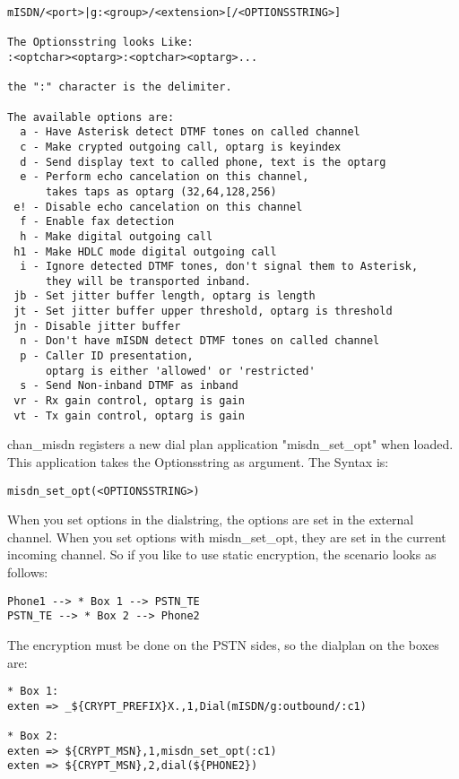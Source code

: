 \begin{astlisting}
\begin{verbatim}
mISDN/<port>|g:<group>/<extension>[/<OPTIONSSTRING>]

The Optionsstring looks Like:
:<optchar><optarg>:<optchar><optarg>...

the ":" character is the delimiter.

The available options are:
  a - Have Asterisk detect DTMF tones on called channel
  c - Make crypted outgoing call, optarg is keyindex
  d - Send display text to called phone, text is the optarg
  e - Perform echo cancelation on this channel,
      takes taps as optarg (32,64,128,256)
 e! - Disable echo cancelation on this channel
  f - Enable fax detection
  h - Make digital outgoing call 
 h1 - Make HDLC mode digital outgoing call 
  i - Ignore detected DTMF tones, don't signal them to Asterisk,
      they will be transported inband.
 jb - Set jitter buffer length, optarg is length
 jt - Set jitter buffer upper threshold, optarg is threshold
 jn - Disable jitter buffer
  n - Don't have mISDN detect DTMF tones on called channel
  p - Caller ID presentation,
      optarg is either 'allowed' or 'restricted'
  s - Send Non-inband DTMF as inband
 vr - Rx gain control, optarg is gain
 vt - Tx gain control, optarg is gain
\end{verbatim}
\end{astlisting}

chan\_misdn registers a new dial plan application "misdn\_set\_opt" when
loaded. This application takes the Optionsstring as argument. The Syntax is:

\begin{verbatim}
misdn_set_opt(<OPTIONSSTRING>)
\end{verbatim}

When you set options in the dialstring, the options are set in the external
channel. When you set options with misdn\_set\_opt, they are set in the current
incoming channel. So if you like to use static encryption, the scenario looks
as follows:

\begin{verbatim}
Phone1 --> * Box 1 --> PSTN_TE
PSTN_TE --> * Box 2 --> Phone2
\end{verbatim}

The encryption must be done on the PSTN sides, so the dialplan on the boxes
are:

\begin{verbatim}
* Box 1:
exten => _${CRYPT_PREFIX}X.,1,Dial(mISDN/g:outbound/:c1)

* Box 2:
exten => ${CRYPT_MSN},1,misdn_set_opt(:c1)
exten => ${CRYPT_MSN},2,dial(${PHONE2})
\end{verbatim}


